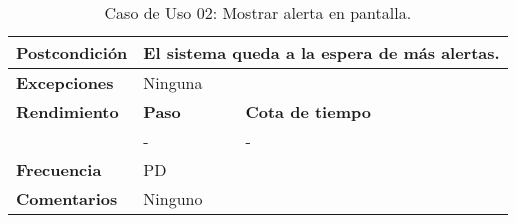 \begin{table}[!ht]
{\begin{tabular}{|l|p{1cm}|p{9cm}|}
                        \textbf{Postcondición} & \multicolumn{2}{|p{10cm}|}{El sistema queda a la espera de más alertas.} \\ \hline
                        \textbf{Excepciones} & \multicolumn{2}{|p{10cm}|}{Ninguna} \\ \hline
                        \textbf{Rendimiento} & \textbf{Paso} & \textbf{Cota de tiempo} \\ \cline{2-3} & - & - \\ \hline
                        \textbf{Frecuencia} & \multicolumn{2}{|p{10cm}|}{PD} \\ \hline
                        \textbf{Comentarios} & \multicolumn{2}{|p{10cm}|}{Ninguno} \\ \hline
                    \end{tabular}
                    }
                    \caption{Caso de Uso 02: Mostrar alerta en pantalla.}
                    \label{UC02_app}
                \end{table}
                

